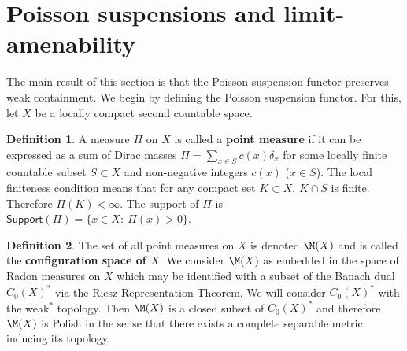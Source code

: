 \documentclass[12pt]{article}
\theoremstyle{plain}
\theoremstyle{definition}
\newtheorem{defn}{Definition}
\theoremstyle{remark}
\begin{document}
\section{Poisson suspensions and limit-amenability}\label{S:Poisson}






The main result of this section is that the Poisson suspension functor preserves weak containment. We begin by defining the Poisson suspension functor. For this, let $X$ be a locally compact second countable space.

\begin{defn}
 A measure $\Pi$ on $X$ is called a {\bf point measure} if it can be expressed as a sum of Dirac masses $\Pi = \sum_{x\in S} c(x)\delta_x$ for some locally finite countable subset $S\subset X$ and non-negative integers $c(x)$ ($x\in S$). The local finiteness condition means that for any compact set $K \subset X$, $K \cap S$ is finite. Therefore $\Pi(K)<\infty$. The support of $\Pi$ is $\mathsf{Support}(\Pi)=\{x\in X:~\Pi(x)>0\}$. 
\end{defn}


\begin{defn}
The set of all point measures on $X$ is denoted $\M(X)$ and is called the \textbf{configuration space of $X$}. We consider $\M(X)$ as embedded in the space of Radon measures on $X$ which may be identified with a subset of the Banach dual $C_0(X)^\ast$ via the Riesz Representation Theorem. We will consider $C_0(X)^\ast$ with the weak$^*$ topology. Then $\M(X)$ is a closed subset of $C_0(X)^\ast$ and therefore $\M(X)$ is Polish in the sense that there exists a complete separable metric inducing its topology.  
\end{defn}
\end{document}
